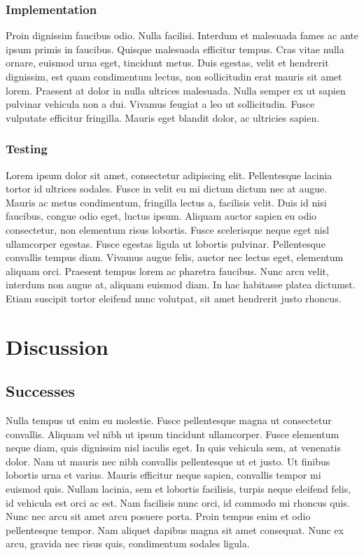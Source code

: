 \subsection{Implementation}
Proin dignissim faucibus odio. Nulla facilisi. Interdum et malesuada fames ac ante ipsum primis in faucibus. Quisque malesuada efficitur tempus. Cras vitae nulla ornare, euismod urna eget, tincidunt metus. Duis egestas, velit et hendrerit dignissim, est quam condimentum lectus, non sollicitudin erat mauris sit amet lorem. Praesent at dolor in nulla ultrices malesuada. Nulla semper ex ut sapien pulvinar vehicula non a dui. Vivamus feugiat a leo ut sollicitudin. Fusce vulputate efficitur fringilla. Mauris eget blandit dolor, ac ultricies sapien.

\subsection{Testing}
Lorem ipsum dolor sit amet, consectetur adipiscing elit. Pellentesque lacinia tortor id ultrices sodales. Fusce in velit eu mi dictum dictum nec at augue. Mauris ac metus condimentum, fringilla lectus a, facilisis velit. Duis id nisi faucibus, congue odio eget, luctus ipsum. Aliquam auctor sapien eu odio consectetur, non elementum risus lobortis. Fusce scelerisque neque eget nisl ullamcorper egestas. Fusce egestas ligula ut lobortis pulvinar. Pellentesque convallis tempus diam. Vivamus augue felis, auctor nec lectus eget, elementum aliquam orci. Praesent tempus lorem ac pharetra faucibus. Nunc arcu velit, interdum non augue at, aliquam euismod diam. In hac habitasse platea dictumst. Etiam suscipit tortor eleifend nunc volutpat, sit amet hendrerit justo rhoncus.


\chapter{Discussion}

\section{Successes}
Nulla tempus ut enim eu molestie. Fusce pellentesque magna ut consectetur convallis. Aliquam vel nibh ut ipsum tincidunt ullamcorper. Fusce elementum neque diam, quis dignissim nisl iaculis eget. In quis vehicula sem, at venenatis dolor. Nam ut mauris nec nibh convallis pellentesque ut et justo. Ut finibus lobortis urna et varius. Mauris efficitur neque sapien, convallis tempor mi euismod quis. Nullam lacinia, sem et lobortis facilisis, turpis neque eleifend felis, id vehicula est orci ac est. Nam facilisis nunc orci, id commodo mi rhoncus quis. Nunc nec arcu sit amet arcu posuere porta. Proin tempus enim et odio pellentesque tempor. Nam aliquet dapibus magna sit amet consequat. Nunc ex arcu, gravida nec risus quis, condimentum sodales ligula.

